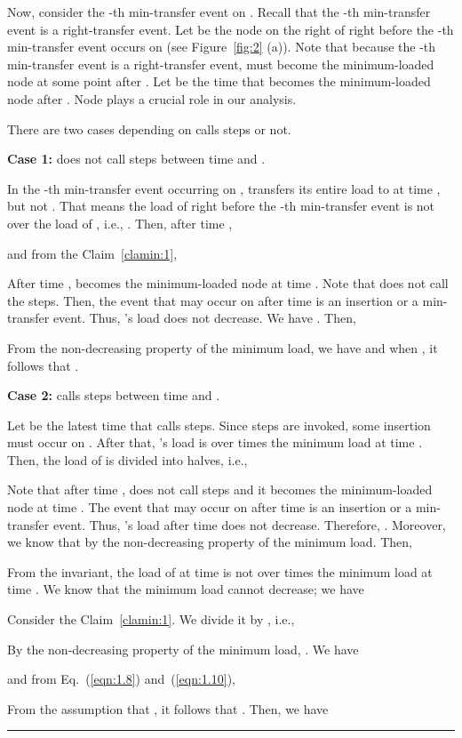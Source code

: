\documentclass[a4paper]{article}
\newenvironment{proof}{{\bf Proof:}}{\hfill\rule{1.5mm}{3mm}\vspace{0.1in}}
\begin{document}
\begin{proof}
  Now, consider the -th min-transfer event on . Recall that the 
  -th min-transfer event is a right-transfer event.  Let  be the node on
  the right of  right before the -th min-transfer event occurs
  on  (see Figure~\ref{fig:2} (a)).  Note that because the
  -th min-transfer event is a right-transfer event, 
  must become the minimum-loaded node at some point after . Let  be the
  time that  becomes the minimum-loaded node  after .
  Node  plays a crucial role in our analysis.
  
  There are two cases depending on  calls {\minbalance} steps or not.
  
  \textbf{Case 1:}  does not call {\minbalance} steps between time
   and .
  
  In the -th min-transfer event occurring on ,  transfers
  its entire load to  at time , but not . That means the
  load of  right before the -th min-transfer event is not over
  the load of , i.e., . Then, after
  time ,

  

  and from the Claim~\ref{clamin:1},
  
  
  After time ,  becomes the minimum-loaded node at  time .
  Note that  does not call the  {\minbalance} steps. Then, the
  event that may occur on  after time  is an insertion or a
  min-transfer event. Thus, 's load does not decrease. We have
  . Then,
  
  
  
  From the non-decreasing property of the minimum load, we have
   and when , it follows that .

  \textbf{Case 2:}  calls {\minbalance} steps between time 
  and .
  
  Let  be the latest time that  calls  {\minbalance}
  steps. Since {\minbalance} steps are invoked, some insertion must occur
  on . After that, 's load is over  times  the minimum
  load at time . Then, the load of  is divided into halves,
  i.e.,
  
  
  Note that after time ,  does not call {\minbalance} steps
  and it becomes the minimum-loaded node at  time . The event that
  may occur on  after time  is an insertion or a min-transfer
  event. Thus, 's load after time  does not decrease. Therefore,
  .  Moreover, we know that  by the non-decreasing property of the minimum
  load. Then,
  
    
 
  From the invariant, the load of  at time  is not
  over  times  the minimum load at time . We know
  that the minimum load cannot decrease; we have

  
  
    Consider the Claim~\ref{clamin:1}. We divide it by ,
  i.e.,

  
  
  By the non-decreasing property of the minimum load,
  . We have
  
 	
  and from Eq.~(\ref{eqn:1.8}) and~(\ref{eqn:1.10}),

  
  
  From the assumption that , it follows that
  . Then, we have
  
  \end{proof}
\end{document}
